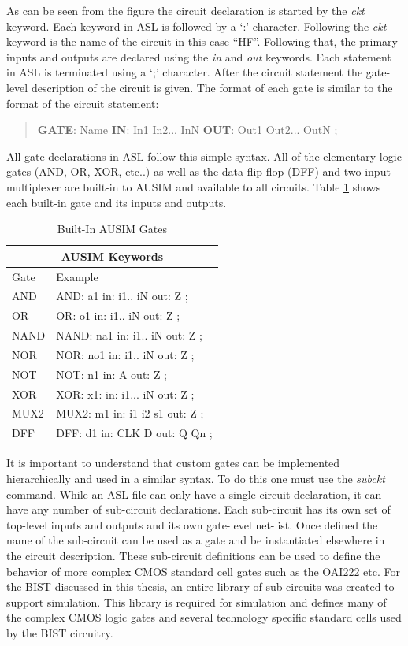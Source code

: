 \documentclass[12pt]{report}
\begin{document}
As can be seen from the figure the circuit declaration is started by the \textit{ckt} keyword\cite{asl}.  Each keyword in ASL is followed by a `:' character\cite{asl}.  Following the \textit{ckt} keyword is the name of the circuit in this case ``HF''.  Following that, the primary inputs and outputs are declared using the \textit{in} and \textit{out} keywords.  Each statement in ASL is terminated using a `;' character\cite{asl}.  After the circuit statement the gate-level description of the circuit is given.  The format of each gate is similar to the format of the circuit statement:
\begin{quote}
	\textbf{GATE}: Name \textbf{IN}: In1 In2... InN \textbf{OUT}: Out1 Out2... OutN ;\cite{asl}
\end{quote}
All gate declarations in ASL follow this simple syntax.  All of the elementary logic gates (AND, OR, XOR, etc..) as well as the data flip-flop (DFF) and two input multiplexer are built-in to AUSIM and available to all circuits\cite{asl}.  Table \ref{tbl:ASLGates} shows each built-in gate and its inputs and outputs.
\begin{table}[bht]
\caption{Built-In AUSIM Gates\cite{asl}}
\begin{center}
\begin{tabular}{|l|l|}
\hline
\multicolumn{2}{|c|}{AUSIM Keywords} \\ \hline
Gate & Example \\ \hline
AND & AND: a1 in: i1.. iN out: Z ; \\ \hline
OR & OR: o1 in: i1.. iN out: Z ; \\ \hline
NAND & NAND: na1 in: i1.. iN out: Z ; \\ \hline
NOR & NOR: no1 in: i1.. iN out: Z ; \\ \hline
NOT & NOT: n1 in: A out: Z ; \\ \hline
XOR & XOR: x1: in: i1... iN out: Z ; \\ \hline
MUX2 & MUX2: m1 in: i1 i2 s1 out: Z ; \\ \hline
DFF & DFF: d1 in: CLK D out: Q Qn ; \\ \hline
\end{tabular}
\end{center}
\label{tbl:ASLGates}
\end{table}

It is important to understand that custom gates can be implemented hierarchically and used in a similar syntax.  To do this one must use the \textit{subckt} command.  While an ASL file can only have a single circuit declaration, it can have any number of sub-circuit declarations\cite{asl}.  Each sub-circuit has its own set of top-level inputs and outputs and its own gate-level net-list.  Once defined the name of the sub-circuit can be used as a gate and be instantiated elsewhere in the circuit description.  These sub-circuit definitions can be used to define the behavior of more complex CMOS standard cell gates such as the OAI222 etc.  For the BIST discussed in this thesis, an entire library of sub-circuits was created to support simulation.  This library is required for simulation and defines many of the complex CMOS logic gates and several technology specific standard cells used by the BIST circuitry. 
\end{document}
